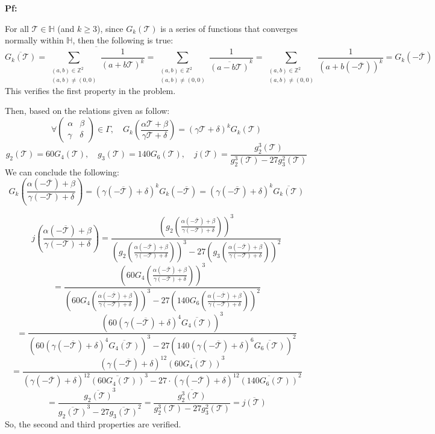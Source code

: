 \documentclass{article}
\begin{document}
\textbf{Pf:}

For all $\mathcal{T}\in\mathbb{H}$ (and $k\geq 3$), since $G_k(\mathcal{T})$ is a series of functions that converges normally within $\mathbb{H}$, then the following is true:
$$\overline{G_k(\mathcal{T})}=\overline{\sum_{\substack{(a,b)\in\mathbb{Z}^2\\(a,b)\neq (0,0)}}\frac{1}{(a+b\mathcal{T})^k}} = \sum_{\substack{(a,b)\in\mathbb{Z}^2\\(a,b)\neq (0,0)}}\frac{1}{\overline{(a-b\mathcal{T})}^k} = \sum_{\substack{(a,b)\in\mathbb{Z}^2\\(a,b)\neq (0,0)}}\frac{1}{(a+b(-\overline{\mathcal{T}}))^k} = G_k(-\overline{\mathcal{T}})$$
This verifies the first property in the problem. 

Then, based on the relations given as follow:
$$\forall \begin{pmatrix}\alpha&\beta\\\gamma&\delta\end{pmatrix}\in \Gamma,\quad G_k\left(\frac{\alpha \mathcal{T}+\beta}{\gamma\mathcal{T}+\delta}\right) = (\gamma\mathcal{T}+\delta)^kG_k(\mathcal{T})$$
$$g_2(\mathcal{T})=60G_4(\mathcal{T}),\quad g_3(\mathcal{T})=140G_6(\mathcal{T}),\quad j(\mathcal{T})=\frac{g_2^3(\mathcal{T})}{g_2^3(\mathcal{T})-27g_3^2(\mathcal{T})}$$
We can conclude the following:
$$G_k\left(\frac{\alpha(-\overline{\mathcal{T}})+\beta}{\gamma(-\mathcal{T})+\delta}\right) = (\gamma(-\overline{\mathcal{T}})+\delta)^kG_k(-\overline{\mathcal{T}})=(\gamma(-\overline{\mathcal{T}})+\delta)^k\overline{G_k(\mathcal{T})}$$

$$j\left(\frac{\alpha(-\overline{\mathcal{T}})+\beta}{\gamma(-\mathcal{T})+\delta}\right) = \frac{\left(g_2\left(\frac{\alpha(-\overline{\mathcal{T}})+\beta}{\gamma(-\mathcal{T})+\delta}\right)\right)^3}{\left(g_2\left(\frac{\alpha(-\overline{\mathcal{T}})+\beta}{\gamma(-\mathcal{T})+\delta}\right)\right)^3-27\left(g_3\left(\frac{\alpha(-\overline{\mathcal{T}})+\beta}{\gamma(-\mathcal{T})+\delta}\right)\right)^2}$$
$$=\frac{\left(60G_4\left(\frac{\alpha(-\overline{\mathcal{T}})+\beta}{\gamma(-\mathcal{T})+\delta}\right)\right)^3}{\left(60G_4\left(\frac{\alpha(-\overline{\mathcal{T}})+\beta}{\gamma(-\mathcal{T})+\delta}\right)\right)^3-27\left(140G_6\left(\frac{\alpha(-\overline{\mathcal{T}})+\beta}{\gamma(-\mathcal{T})+\delta}\right)\right)^2}$$
$$=\frac{(60(\gamma(-\overline{\mathcal{T}})+\delta)^4\overline{G_4(\mathcal{T})})^3}{(60(\gamma(-\overline{\mathcal{T}})+\delta)^4\overline{G_4(\mathcal{T})})^3-27(140(\gamma(-\overline{\mathcal{T}})+\delta)^6\overline{G_6(\mathcal{T})})^2}$$
$$=\frac{(\gamma(-\overline{\mathcal{T}})+\delta)^{12}\overline{(60G_4(\mathcal{T}))}^3}{(\gamma(-\overline{\mathcal{T}})+\delta)^{12}\overline{(60G_4(\mathcal{T}))}^3-27\cdot (\gamma(-\overline{\mathcal{T}})+\delta)^{12}\overline{(140G_6(\mathcal{T}))}^2}$$
$$=\frac{\overline{g_2(\mathcal{T})}^3}{\overline{g_2(\mathcal{T})}^3-27\overline{g_3(\mathcal{T})}^2} = \overline{\frac{g_2^3(\mathcal{T})}{g_2^3(\mathcal{T})-27g_3^2(\mathcal{T})}} = \overline{j(\mathcal{T})}$$
So, the second and third properties are verified.
\end{document}
